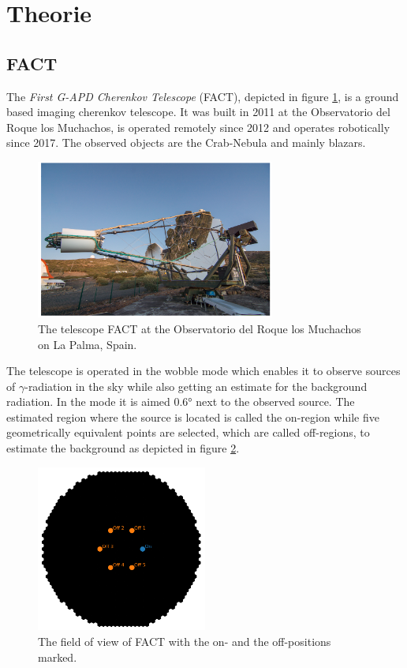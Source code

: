 \section{Theorie}
\label{sec:Theorie}

\subsection{FACT}

The \textit{First G-APD Cherenkov Telescope} (FACT), depicted in figure \ref{fig:FACT}, is a ground based imaging cherenkov telescope. It was built in 2011 at the Observatorio 
del Roque los Muchachos, is operated remotely since 2012 and operates robotically since 2017.
The observed objects are the Crab-Nebula and mainly blazars. 
%
\begin{figure}[H]
    \centering
    \includegraphics[width=0.7\textwidth]{graphics/FACT.png}
    \caption{The telescope FACT at the Observatorio del Roque los Muchachos on La Palma, Spain. \cite{sample}}
    \label{fig:FACT}
  \end{figure}
The telescope is operated in the wobble mode which enables it to observe sources of $\gamma$-radiation in the sky while also getting an estimate for the 
background radiation. In the mode it is aimed $0.6 °$ next to the observed source. The estimated region where the source is located is called the on-region 
while five geometrically equivalent points are selected, which are called off-regions, to estimate the background as depicted in figure 
\ref{fig:OnOff}. 

\begin{figure}[H]
    \centering
    \includegraphics[width=0.5\textwidth]{graphics/OnOff.png}
    \caption{The field of view of FACT with the on- and the off-positions marked. \cite{sample}}
    \label{fig:OnOff}
\end{figure}

